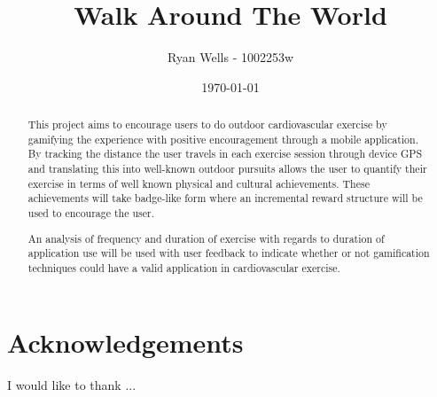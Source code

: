 \documentclass{l4proj}
\begin{document}
\newcommand{\todo}[1]{\textcolor{red}{#1}}
	
	
\title{Walk Around The World}
\author{Ryan Wells - 1002253w}
\date{\today}
\maketitle
\begin{abstract}

This project aims to encourage users to do outdoor cardiovascular
exercise by gamifying the experience with positive encouragement
through a mobile application. By tracking the distance the user
travels in each exercise session through device GPS and translating
this into well-known outdoor pursuits allows the user to quantify
their exercise in terms of well known physical and cultural
achievements. These achievements will take badge-like form where an
incremental reward structure will be used to encourage the user. 




An analysis of frequency and duration of exercise with regards to
duration of application use will be used with user feedback to
indicate whether or not gamification techniques could have a valid
application in cardiovascular exercise.  

\end{abstract}
\tableofcontents
\pagebreak
{}






\section{Acknowledgements}
I would like to thank ...



\appendix




\end{document}
